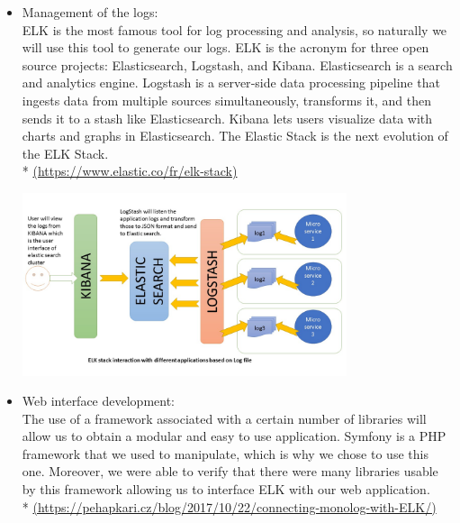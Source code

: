 \begin{itemize}
\begin{center}
  \end{center}

\pagebreak

\item
  Management of the logs: \\

  ELK is the most famous tool for log processing and analysis, so naturally we will use this tool to generate our logs.
  ELK is the acronym for three open source projects:
  Elasticsearch, Logstash, and Kibana. Elasticsearch is a search and
  analytics engine. Logstash is a server‑side data processing pipeline
  that ingests data from multiple sources simultaneously, transforms it,
  and then sends it to a stash like Elasticsearch. Kibana lets
  users visualize data with charts and graphs in Elasticsearch. The
  Elastic Stack is the next evolution of the ELK Stack.\\ *
  \url{(https://www.elastic.co/fr/elk-stack)}\\
  \begin{center}

  \includegraphics[width=0.75\textwidth]{images/elk-example.jpg}

  \end{center}

\item 
  Web interface development: \\

  The use of a framework associated with a certain number of libraries will
  allow us to obtain a modular and easy to use application.
  Symfony is a PHP framework that we used to manipulate, which is why we chose 
  to use this one. Moreover, we were able to verify that there were many 
  libraries usable by this framework allowing us to interface ELK with our web
  application. \\ *
  \url{(https://pehapkari.cz/blog/2017/10/22/connecting-monolog-with-ELK/)}\\


\end{itemize}
